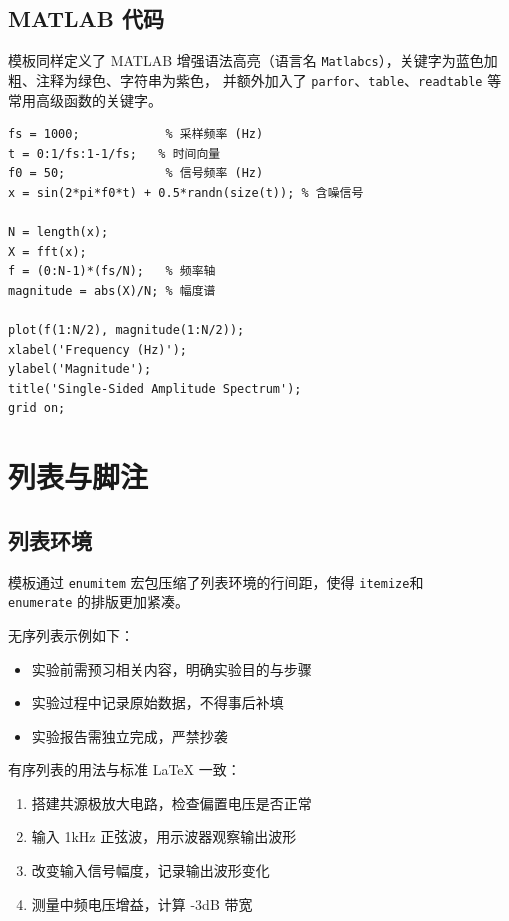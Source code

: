 \documentclass{sysu_report}
\begin{document}
\subsection{MATLAB 代码}
模板同样定义了 MATLAB 增强语法高亮（语言名 \texttt{Matlabcs}），关键字为蓝色加粗、注释为绿色、字符串为紫色，
并额外加入了 \texttt{parfor}、\texttt{table}、\texttt{readtable} 等常用高级函数的关键字。

\begin{lstlisting}[language=Matlabcs, caption={MATLAB 信号频谱分析示例}]
% 生成含噪声的正弦信号并绘制频谱
fs = 1000;            % 采样频率 (Hz)
t = 0:1/fs:1-1/fs;   % 时间向量
f0 = 50;              % 信号频率 (Hz)
x = sin(2*pi*f0*t) + 0.5*randn(size(t)); % 含噪信号

N = length(x);
X = fft(x);
f = (0:N-1)*(fs/N);   % 频率轴
magnitude = abs(X)/N; % 幅度谱

plot(f(1:N/2), magnitude(1:N/2));
xlabel('Frequency (Hz)');
ylabel('Magnitude');
title('Single-Sided Amplitude Spectrum');
grid on;
\end{lstlisting}

\section{列表与脚注}
\subsection{列表环境}
模板通过 \texttt{enumitem} 宏包压缩了列表环境的行间距，使得 \texttt{itemize}和\\
 \texttt{enumerate} 的排版更加紧凑。\par
无序列表示例如下：

\begin{itemize}
    \item 实验前需预习相关内容，明确实验目的与步骤
    \item 实验过程中记录原始数据，不得事后补填
    \item 实验报告需独立完成，严禁抄袭
\end{itemize}

有序列表的用法与标准 \LaTeX{} 一致：

\begin{enumerate}
    \item 搭建共源极放大电路，检查偏置电压是否正常
    \item 输入 1kHz 正弦波，用示波器观察输出波形
    \item 改变输入信号幅度，记录输出波形变化
    \item 测量中频电压增益，计算 -3dB 带宽
\end{enumerate}
\end{document}
